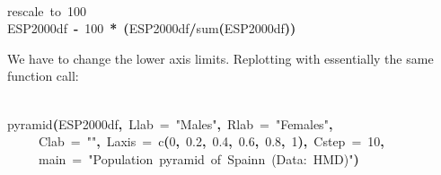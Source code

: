 \documentclass[a4paper]{article}
\newcommand{\hlnumber}[1]{\textcolor[rgb]{0.0823529411764706,0.0784313725490196,0.709803921568627}{#1}}%
\newcommand{\hlfunctioncall}[1]{\textcolor[rgb]{1,0,0}{#1}}%
\newcommand{\hlstring}[1]{\textcolor[rgb]{0.6,0.6,1}{#1}}%
\newcommand{\hlkeyword}[1]{\textcolor[rgb]{0,0,0}{\textbf{#1}}}%
\newcommand{\hlargument}[1]{\textcolor[rgb]{0.694117647058824,0.247058823529412,0.0196078431372549}{#1}}%
\newcommand{\hlcomment}[1]{\textcolor[rgb]{0.8,0.8,0.8}{#1}}%
\newcommand{\hlassignement}[1]{\textcolor[rgb]{0.215686274509804,0.215686274509804,0.384313725490196}{\textbf{#1}}}%
\newcommand{\hlsymbol}[1]{\textcolor[rgb]{0,0,0}{#1}}%
\newcommand{\hlprompt}[1]{\textcolor[rgb]{0,0,0}{#1}}%
\newcommand{\hlstd}[1]{\textcolor[rgb]{0,0,0}{#1}}%
\newenvironment{Houtput}{\raggedright}{%
%
}
\begin{document}
\begin{Houtput}
\hspace*{\fill}\\
\hlstd{}\ttfamily\noindent
\hlprompt{\usebox{\hlnormalsizeboxgreaterthan}{\ }}\hlcomment{\usebox{\hlnormalsizeboxhash}{\ }rescale{\ }to{\ }100}\mbox{}
\normalfont
\hspace*{\fill}\\
\hlstd{}\ttfamily\noindent
\hlprompt{\usebox{\hlnormalsizeboxgreaterthan}{\ }}\hlsymbol{ESP2000df}{\ }\hlassignement{\usebox{\hlnormalsizeboxlessthan}-}{\ }\hlnumber{100}{\ }\hlkeyword{*}{\ }\hlkeyword{(}\hlsymbol{ESP2000df}\hlkeyword{/}\hlfunctioncall{sum}\hlkeyword{(}\hlsymbol{ESP2000df}\hlkeyword{)}\hlkeyword{)}\mbox{}
\normalfont
\hspace*{\fill}\\
\hlstd{}
\end{Houtput}

We have to change the lower axis limits. Replotting with essentially the same function call:

\begin{Houtput}
\hspace*{\fill}\\
\hlstd{}\ttfamily\noindent
\hlprompt{\usebox{\hlnormalsizeboxgreaterthan}{\ }}\hlfunctioncall{pyramid}\hlkeyword{(}\hlsymbol{ESP2000df}\hlkeyword{,}{\ }\hlargument{Llab}{\ }\hlargument{=}{\ }\hlstring{"Males"}\hlkeyword{,}{\ }\hlargument{Rlab}{\ }\hlargument{=}{\ }\hlstring{"Females"}\hlkeyword{,}\hspace*{\fill}\\
\hlstd{}\hlprompt{{\ }}{\ }{\ }{\ }{\ }\hlargument{Clab}{\ }\hlargument{=}{\ }\hlstring{""}\hlkeyword{,}{\ }\hlargument{Laxis}{\ }\hlargument{=}{\ }\hlfunctioncall{c}\hlkeyword{(}\hlnumber{0}\hlkeyword{,}{\ }\hlnumber{0.2}\hlkeyword{,}{\ }\hlnumber{0.4}\hlkeyword{,}{\ }\hlnumber{0.6}\hlkeyword{,}{\ }\hlnumber{0.8}\hlkeyword{,}{\ }\hlnumber{1}\hlkeyword{)}\hlkeyword{,}{\ }\hlargument{Cstep}{\ }\hlargument{=}{\ }\hlnumber{10}\hlkeyword{,}\hspace*{\fill}\\
\hlstd{}\hlprompt{{\ }}{\ }{\ }{\ }{\ }\hlargument{main}{\ }\hlargument{=}{\ }\hlstring{"Population{\ }pyramid{\ }of{\ }Spain\usebox{\hlnormalsizeboxbackslash}n{\ }(Data:{\ }HMD)"}\hlkeyword{)}\mbox{}
\normalfont
\hspace*{\fill}\\
\hlstd{}
\end{Houtput}
\end{document}
